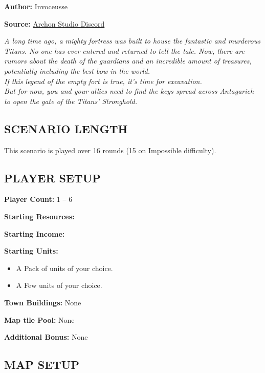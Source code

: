 
\begin{multicols*}{2}

\textbf{Author:} Invoceusse

\textbf{Source:} \href{https://discord.com/channels/740870068178649108/1219333721019256943}{Archon Studio Discord}

\textit{A long time ago, a mighty fortress was built to house the fantastic and murderous Titans.
  No one has ever entered and returned to tell the tale.
  Now, there are rumors about the death of the guardians and an incredible amount of treasures, potentially including the best bow in the world.\\
  If this legend of the empty fort is true, it's time for excavation.\\
  But for now, you and your allies need to find the keys spread across Antagarich to open the gate of the Titans' Stronghold.
}
\subsection*{\MakeUppercase{Scenario Length}}

This scenario is played over 16 rounds (15 on Impossible difficulty).

\subsection*{\MakeUppercase{Player setup}}

\textbf{Player Count:} 1 -- 6

\textbf{Starting Resources:}\par
{}

\textbf{Starting Income:}\par
{}

\textbf{Starting Units:}
\begin{itemize}
  \item A Pack of  units of your choice.
  \item A Few  units of your choice.
\end{itemize}

\textbf{Town Buildings:} None

\textbf{Map tile Pool:} None

\textbf{Additional Bonus:} None

\subsection*{\MakeUppercase{Map Setup}}


\end{multicols*}
